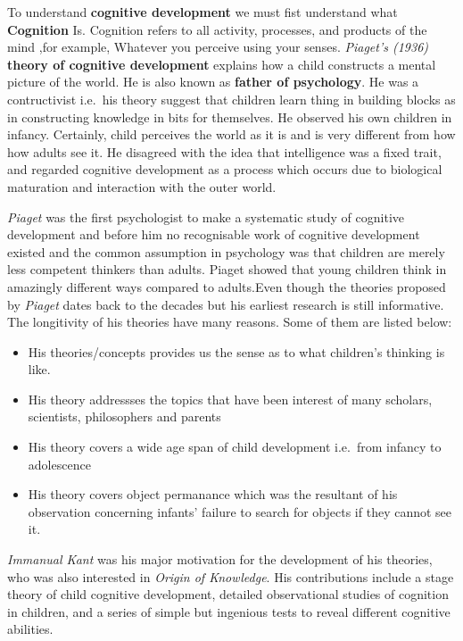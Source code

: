 \documentclass[11pt]{article}
\providecommand{\tightlist}{%
      \setlength{\itemsep}{0pt}\setlength{\parskip}{0pt}}
\begin{document}
To understand \textbf{cognitive development} we must fist understand
what \textbf{Cognition} Is. Cognition refers to all activity, processes,
and products of the mind ,for example, Whatever you perceive using your
senses. \emph{Piaget's (1936)} \textbf{theory of cognitive development}
explains how a child constructs a mental picture of the world. He is
also known as \textbf{father of psychology}. He was a contructivist
i.e.~his theory suggest that children learn thing in building blocks as
in constructing knowledge in bits for themselves. He observed his own
children in infancy. Certainly, child perceives the world as it is and
is very different from how how adults see it. He disagreed with the idea
that intelligence was a fixed trait, and regarded cognitive development
as a process which occurs due to biological maturation and interaction
with the outer world.

\emph{Piaget }was the first psychologist to make a systematic study of
cognitive development and before him no recognisable work of cognitive
development existed and the common assumption in psychology was that
children are merely less competent thinkers than adults. Piaget showed
that young children think in amazingly different ways compared to
adults.Even though the theories proposed by \emph{Piaget} dates back to
the decades but his earliest research is still informative. The
longitivity of his theories have many reasons. Some of them are listed
below:

\begin{itemize}
\tightlist
\item
  His theories/concepts provides us the sense as to what children's
  thinking is like.
\item
  His theory addressses the topics that have been interest of many
  scholars, scientists, philosophers and parents
\item
  His theory covers a wide age span of child development i.e.~from
  infancy to adolescence
\item
  His theory covers object permanance which was the resultant of his
  observation concerning infants' failure to search for objects if they
  cannot see it.
\end{itemize}

    \emph{Immanual Kant} was his major motivation for the development of his
theories, who was also interested in \emph{Origin of Knowledge}. His
contributions include a stage theory of child cognitive development,
detailed observational studies of cognition in children, and a series of
simple but ingenious tests to reveal different cognitive abilities.
\end{document}
